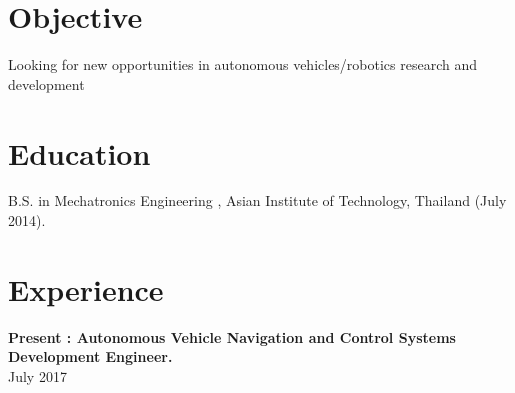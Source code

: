 \documentclass[margin]{res}
\begin{document}
\begin{resume}

\section{Objective}

Looking for new opportunities in autonomous vehicles/robotics research and development


% 
% 

\section{Education}

B.S. in Mechatronics Engineering , Asian Institute of Technology, Thailand
(July 2014).


\section{Experience}

{\bf Present : Autonomous Vehicle Navigation and Control Systems Development Engineer.}
\\ 
\hfill  July 2017 


\end{resume}
\end{document}
